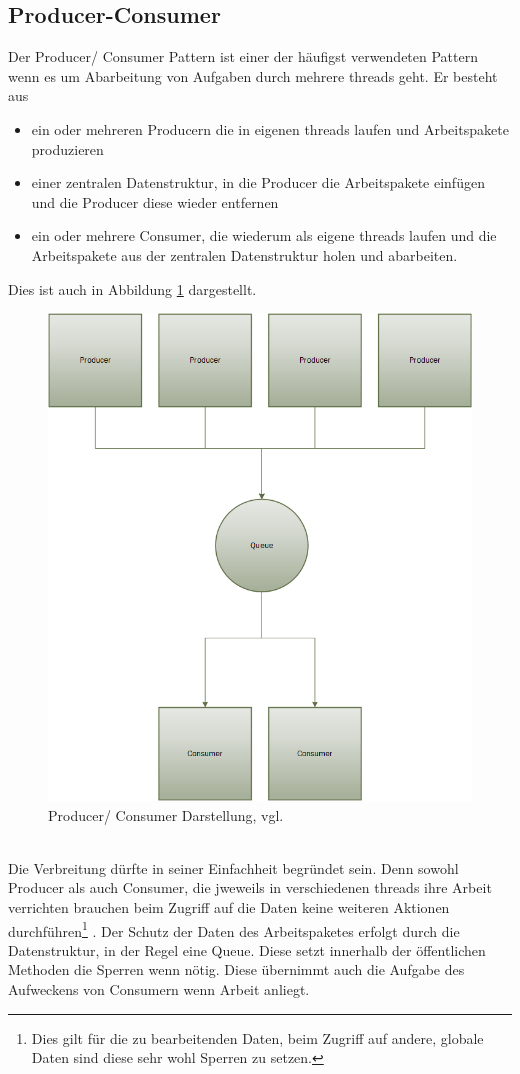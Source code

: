 \subsection{Producer-Consumer}\label{sec:producerconsumer}
Der Producer/ Consumer Pattern ist einer der häufigst verwendeten Pattern wenn es um Abarbeitung von Aufgaben durch mehrere threads geht. Er besteht aus 
\begin{itemize}
	\item ein oder mehreren Producern die in eigenen threads laufen und Arbeitspakete produzieren
	\item einer zentralen Datenstruktur, in die Producer die Arbeitspakete einfügen und die Producer diese wieder entfernen
	\item ein oder mehrere Consumer, die wiederum als eigene threads laufen und die Arbeitspakete aus der zentralen Datenstruktur holen und abarbeiten.
\end{itemize}
Dies ist auch in Abbildung \ref{fig:architecture} dargestellt.\parencite{jthreads}
\begin{figure}
	\centering
	\includegraphics[width=0.7\linewidth]{images/B2_Producer_Consumer_1}
	\caption{Producer/ Consumer Darstellung, vgl. \parencite[S. 163]{jthreads}}
	\label{fig:architecture}
\end{figure}
\\Die Verbreitung dürfte in seiner Einfachheit begründet sein. Denn sowohl Producer als auch Consumer, die jweweils in verschiedenen threads ihre Arbeit verrichten brauchen beim Zugriff auf die Daten keine weiteren Aktionen durchführen\footnote{Dies gilt für die zu bearbeitenden Daten, beim Zugriff auf andere, globale Daten sind diese sehr wohl Sperren zu setzen.} \parencite[S. 163ff]{jthreads}. Der Schutz der Daten des Arbeitspaketes erfolgt durch die Datenstruktur, in der Regel eine Queue. Diese setzt innerhalb der öffentlichen Methoden die Sperren wenn nötig. Diese übernimmt auch die Aufgabe des Aufweckens von Consumern wenn Arbeit anliegt.
